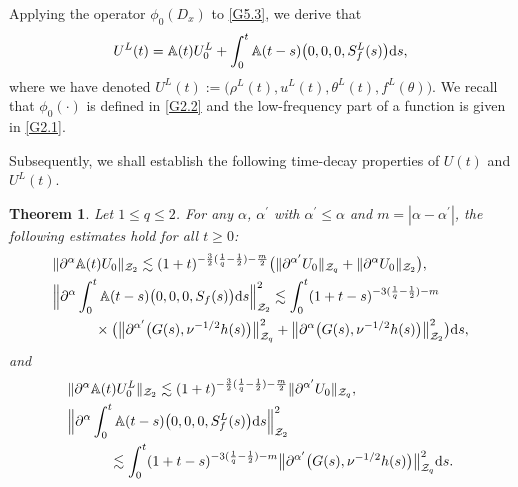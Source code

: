 \documentclass[reqno,11pt]{amsart}
\theoremstyle{plain}
\newtheorem{thm}{Theorem}[section]
\numberwithin{equation}{section}
\begin{document}
Applying the operator $\phi_0(D_x)$ to \eqref{G5.3}, we derive  that
\begin{align}\label{G5.4}  
U^L(t) = \mathbb{A}(t)U^L_{0} + \int_{0}^{t}\mathbb{A}(t-s)\big(0,0,0,{S}_f^L(s)\big){\rm d}s,  
\end{align}  
where we have denoted $U^L(t):= \big(\rho^L(t), u^L(t), \theta^L(t), f^L(\theta)\big)$. We recall 
that $\phi_0(\cdot)$ is defined in \eqref{G2.2} and the low-frequency part of a function is given 
in \eqref{G2.1}.

Subsequently, we shall establish the following time-decay properties of $U(t)$ and $U^L(t)$.


\begin{thm}\label{T5.1}
Let $1\leq q\leq2$. For any $\alpha$, $\alpha^{\prime}$ with 
$\alpha^{\prime}\leq\alpha$ and $m=|\alpha-\alpha^{\prime}|$, the following estimates hold for 
  all $t\geq 0$:
\begin{align}\label{G5.5}
& \|\partial^{\alpha}\mathbb{A}(t)U_{0}\|_{\mathcal{Z}_{2}}
\lesssim (1+t )^{-\frac{3}{2}(\frac{1}{q}-\frac{1}{2})-\frac{m}{2}}
\big(\|\partial^{\alpha^{\prime}}U_{0}\|_{\mathcal{Z}_{q}}+\|\partial^{\alpha}U_{0}\|_{\mathcal{Z}_{2}}\big),\\ \label{G5.6}
&\Big\|\partial^{\alpha}\int_{0}^{t}\mathbb{A}(t-s)
\big( 0,0,0,S_f(s)\big){\rm d}s \Big\|_{\mathcal{Z}_{2}}^{2}
  \lesssim\int_0^t(1+t-s)^{-3(\frac{1}{q}-\frac{1}{2})-m}\nonumber\\
&\qquad \quad   \times \big(\big\|\partial^{\alpha^{\prime}}\big(G(s),\nu^{-1/2}h(s)\big)\big\|_{\mathcal{Z}_{q}}^{2}
+\big\|\partial^{\alpha}\big(G(s),\nu^{-1/2}h(s)\big)\big\|_{\mathcal{Z}_{2}}^{2}\big){\rm d}s, 
\end{align}
and
\begin{align}\label{G5.7}
 &\|\partial^{\alpha}\mathbb{A}(t)U_{0}^L\|_{\mathcal{Z}_{2}}
\lesssim  (1+t )^{-\frac{3}{2}(\frac{1}{q}-\frac{1}{2})-\frac{m}{2}}
 \|\partial^{\alpha^{\prime}}U_{0}\|_{\mathcal{Z}_{q}},  \qquad  \\ \label{G5.8}
&\Big\|\partial^{\alpha}\int_{0}^{t}\mathbb{A}(t-s)
\big( 0,0,0,S^L_f(s)\big){\rm d}s\Big\|_{\mathcal{Z}_{2}}^{2}\nonumber\\
&\qquad\quad   \lesssim\int_0^t(1+t-s)^{-3(\frac{1}{q}-\frac{1}{2})-m}   \big\|\partial^{\alpha^{\prime}}\big(G(s),\nu^{-1/2}h(s)\big) \big\|_{\mathcal{Z}_{q}}^{2}
 {\rm d}s. 
\end{align}
\end{thm}
\end{document}
